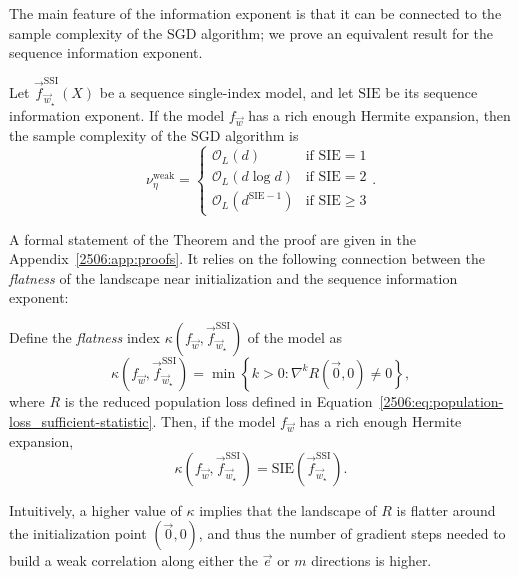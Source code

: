 The main feature of the information exponent is that it can be connected to the sample complexity of the SGD algorithm; we prove an equivalent result for the sequence information exponent.
\begin{theorem}[Informal] \label{2506:thm:sie}
    Let \(\vec{f}^\mathrm{SSI}_{\vec w_{\star}}(X)\) be a sequence single-index model, and let \(\text{SIE}\) be its sequence information exponent. If the model \(f_{\vec{w}}\) has a rich enough Hermite expansion, then the sample complexity of the SGD algorithm is
    \[
        \nu^\mathrm{weak}_\eta = \begin{cases}
            \mathcal{O}_L(d) & \text{if } \text{SIE} = 1 \\
            \mathcal{O}_L(d \log d) & \text{if } \text{SIE} = 2 \\
            \mathcal{O}_L(d^{\text{SIE}-1}) & \text{if } \text{SIE} \ge 3 
        \end{cases}.
    \]
\end{theorem}
A formal statement of the Theorem and the proof are given in the Appendix~\ref{2506:app:proofs}. It relies on the following connection between the \emph{flatness} of the landscape near initialization and the sequence information exponent:
\begin{proposition} \label{2506:prop:flatness}
    Define the \emph{flatness} index \(\kappa(f_{\vec{w}}, \vec{f}^\mathrm{SSI}_{\vec w_{\star}})\) of the model as
    \[ \kappa(f_{\vec{w}}, \vec{f}^\mathrm{SSI}_{\vec w_{\star}}) = \min \left\{ k > 0 \colon \nabla^{k}R(\vec{0}, 0) \neq 0 \right\}, \]
    where \(R\) is the reduced population loss defined in Equation~\eqref{2506:eq:population-loss_sufficient-statistic}. Then, if the model \(f_{\vec{w}}\) has a rich enough Hermite expansion,
    \[ \kappa\left(f_{\vec{w}}, \vec{f}^\mathrm{SSI}_{\vec w_{\star}}\right) = \text{SIE}\left(\vec{f}^\mathrm{SSI}_{\vec w_{\star}}\right). \]
\end{proposition}
Intuitively, a higher value of \(\kappa\) implies that the landscape of \(R\) is flatter around the initialization point \((\vec{0}, 0)\), and thus the number of gradient steps needed to build a weak correlation along either the \(\vec{e}\) or \(m\) directions is higher.

